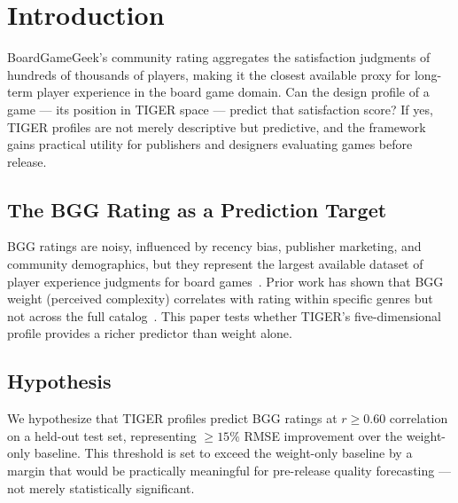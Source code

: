 \section{Introduction}
\label{sec:intro}

BoardGameGeek's community rating aggregates the satisfaction judgments of hundreds of
thousands of players, making it the closest available proxy for long-term player
experience in the board game domain. Can the design profile of a game --- its position
in TIGER space --- predict that satisfaction score? If yes, TIGER profiles are not
merely descriptive but predictive, and the framework gains practical utility for
publishers and designers evaluating games before release.

\subsection{The BGG Rating as a Prediction Target}

BGG ratings are noisy, influenced by recency bias, publisher marketing, and
community demographics, but they represent the largest available dataset of player
experience judgments for board games~\cite{booth2021game}. Prior work has shown that
BGG weight (perceived complexity) correlates with rating within specific genres but
not across the full catalog~\cite{woods2012eurogames}. This paper tests whether
TIGER's five-dimensional profile provides a richer predictor than weight alone.

\subsection{Hypothesis}

We hypothesize that TIGER profiles predict BGG ratings at $r \geq 0.60$ correlation
on a held-out test set, representing $\geq 15\%$ RMSE improvement over the weight-only
baseline. This threshold is set to exceed the weight-only baseline by a margin that
would be practically meaningful for pre-release quality forecasting --- not merely
statistically significant.
